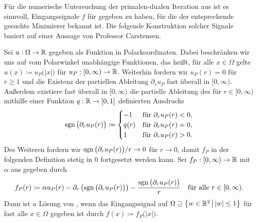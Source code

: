 Für die numerische Untersuchung der primalen-dualen Iteration aus
 ist es sinnvoll, Eingangssignale $f$ für
 gegeben zu haben, für die der entsprechende
gesuchte Minimierer bekannt ist. 
Die folgende Konstruktion solcher Signale basiert auf einer Aussage von
Professor Carstensen.

Sei $u:\Omega\to\mathbb{R}$ gegeben als Funktion in Polarkoordinaten. 
Dabei beschränken wir uns auf vom Polarwinkel unabhängige Funktionen, das
heißt, für alle $x\in\Omega$ gelte
$u(x)\coloneqq u_P\big(|x|\big)$ für $u_P:[0,\infty)\to\mathbb{R}$. 
Weiterhin fordern wir $u_P(r)=0$ für $r\geq 1$ und die Existenz
der partiellen Ableitung $\partial_r u_P$ fast überall in $[0,\infty)$.
Außerdem existiere fast überall in $[0,\infty)$ die partielle Ableitung des für
$r\in[0,\infty)$ mithilfe einer Funktion $q:\mathbb{R}\to[0,1]$ definierten Ausdrucks
\begin{align*}
  \operatorname{sgn}\big(\partial_r u_P(r)\big)
  \coloneqq
  \begin{cases}
    -1 &\text{für }\partial_r u_P(r)<0,\\
    q(r) &\text{für }\partial_r u_P(r)=0,\\ 
    1 &\text{für }\partial_r u_P(r)>0.
  \end{cases}
\end{align*}
Des Weiteren fordern wir $\operatorname{sgn}\big(\partial_r u_P(r)\big)/r\to 0$ für $r\to 0$, 
damit $f_P$ in der folgenden Definition stetig in $0$ fortgesetzt werden kann.
Sei $f_P:[0,\infty)\to\mathbb{R}$ mit $\alpha$ aus 
gegeben durch
\begin{align}
  \label{eq:constructionInputSignal}
  f_P(r)
  \coloneqq 
  \alpha u_P(r) - \partial_r\left(\operatorname{sgn}\big(\partial_r u_P(r)\big)\right) 
  - \frac{\operatorname{sgn}\big(\partial_r u_P(r)\big)}{r}
  \quad\text{für alle }r\in[0,\infty).
\end{align}
Dann ist $u$ Lösung von , wenn das Eingangssignal
auf $\Omega\supseteq \left\{w\in\mathbb{R}^2\,\middle|\, |w|\leq 1\right\}$ für fast
alle $x\in\Omega$ gegeben ist durch $f(x)\coloneqq f_P\big(|x|\big)$.

